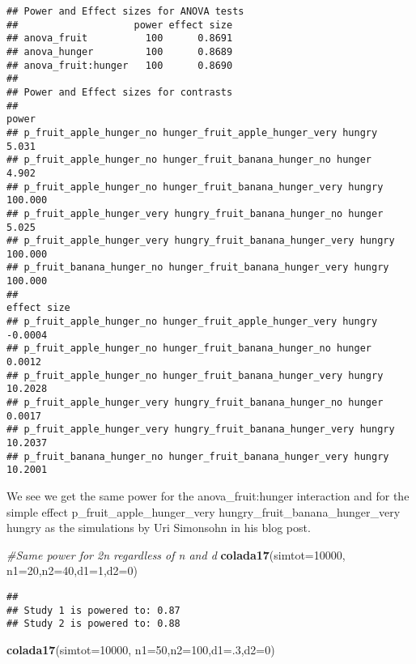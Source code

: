 \documentclass[]{article}
\newenvironment{Shaded}{\begin{snugshade}}{\end{snugshade}}
\newcommand{\KeywordTok}[1]{\textcolor[rgb]{0.13,0.29,0.53}{\textbf{#1}}}
\newcommand{\DataTypeTok}[1]{\textcolor[rgb]{0.13,0.29,0.53}{#1}}
\newcommand{\DecValTok}[1]{\textcolor[rgb]{0.00,0.00,0.81}{#1}}
\newcommand{\CommentTok}[1]{\textcolor[rgb]{0.56,0.35,0.01}{\textit{#1}}}
\newcommand{\NormalTok}[1]{#1}
\begin{document}
\begin{verbatim}
## Power and Effect sizes for ANOVA tests
##                    power effect size
## anova_fruit          100      0.8691
## anova_hunger         100      0.8689
## anova_fruit:hunger   100      0.8690
## 
## Power and Effect sizes for contrasts
##                                                                    power
## p_fruit_apple_hunger_no hunger_fruit_apple_hunger_very hungry      5.031
## p_fruit_apple_hunger_no hunger_fruit_banana_hunger_no hunger       4.902
## p_fruit_apple_hunger_no hunger_fruit_banana_hunger_very hungry   100.000
## p_fruit_apple_hunger_very hungry_fruit_banana_hunger_no hunger     5.025
## p_fruit_apple_hunger_very hungry_fruit_banana_hunger_very hungry 100.000
## p_fruit_banana_hunger_no hunger_fruit_banana_hunger_very hungry  100.000
##                                                                  effect size
## p_fruit_apple_hunger_no hunger_fruit_apple_hunger_very hungry        -0.0004
## p_fruit_apple_hunger_no hunger_fruit_banana_hunger_no hunger          0.0012
## p_fruit_apple_hunger_no hunger_fruit_banana_hunger_very hungry       10.2028
## p_fruit_apple_hunger_very hungry_fruit_banana_hunger_no hunger        0.0017
## p_fruit_apple_hunger_very hungry_fruit_banana_hunger_very hungry     10.2037
## p_fruit_banana_hunger_no hunger_fruit_banana_hunger_very hungry      10.2001
\end{verbatim}

We see we get the same power for the anova\_fruit:hunger interaction and
for the simple effect p\_fruit\_apple\_hunger\_very
hungry\_fruit\_banana\_hunger\_very hungry as the simulations by Uri
Simonsohn in his blog post.

\begin{Shaded}
\begin{Highlighting}[]
\CommentTok{#Same power for 2n regardless of n and d}
  \KeywordTok{colada17}\NormalTok{(}\DataTypeTok{simtot=}\DecValTok{10000}\NormalTok{, }\DataTypeTok{n1=}\DecValTok{20}\NormalTok{,}\DataTypeTok{n2=}\DecValTok{40}\NormalTok{,}\DataTypeTok{d1=}\DecValTok{1}\NormalTok{,}\DataTypeTok{d2=}\DecValTok{0}\NormalTok{)  }
\end{Highlighting}
\end{Shaded}

\begin{verbatim}
## 
## Study 1 is powered to: 0.87
## Study 2 is powered to: 0.88
\end{verbatim}

\begin{Shaded}
\begin{Highlighting}[]
  \KeywordTok{colada17}\NormalTok{(}\DataTypeTok{simtot=}\DecValTok{10000}\NormalTok{, }\DataTypeTok{n1=}\DecValTok{50}\NormalTok{,}\DataTypeTok{n2=}\DecValTok{100}\NormalTok{,}\DataTypeTok{d1=}\NormalTok{.}\DecValTok{3}\NormalTok{,}\DataTypeTok{d2=}\DecValTok{0}\NormalTok{)}
\end{Highlighting}
\end{Shaded}
\end{document}
